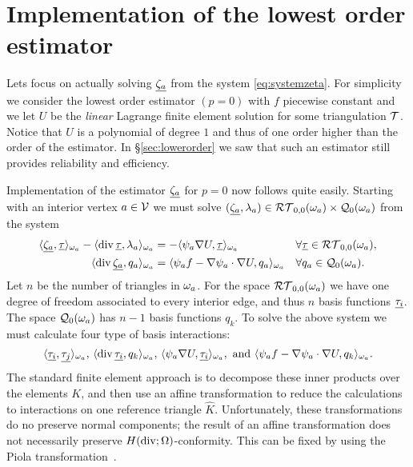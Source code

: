 \documentclass[thesis.tex]{subfiles}
\begin{document}
\section{Implementation of the lowest order estimator}
Lets focus on actually solving $\underline{\zeta_a}$ from the system \eqref{eq:systemzeta}. 
For simplicity we consider the lowest order estimator $(p=0)$ with $f$ piecewise constant and 
we let $U$ be the \emph{linear} Lagrange finite element solution for some triangulation $\mathcal{T}$. 
Notice that $U$ is a polynomial of degree $1$ and thus of one order higher than the order of the estimator.
In \S\ref{sec:lowerorder} we saw that such an estimator still provides reliability and efficiency.


Implementation of the estimator $\underline{\zeta_a}$ for $p=0$ now follows quite easily. 
Starting with an interior vertex $a \in \mathcal{V}$ we must solve $(\underline{\zeta_a}, \lambda_a) \in \mathcal{RT}_{0,0}(\omega_a)\times \mathcal{Q}_0(\omega_a)$ from the system
\begin{equation}
  \label{eq:systemp0}
  \begin{alignedat}{3}
    \langle \underline{\zeta_a}, \underline{\tau} \rangle_{\omega_a} - \langle \operatorname{div} \underline{\tau}, {\lambda_a} \rangle_{\omega_a} &= - \langle \psi_a \nabla U, \underline{\tau} \rangle_{\omega_a} && \quad \forall \underline{\tau} \in \mathcal{RT}_{0,0}(\omega_a),\\
    \langle \operatorname{div} \underline{\zeta_a}, q_a \rangle_{\omega_a} &= \langle \psi_a f - \nabla \psi_a \cdot \nabla U, q_a \rangle_{\omega_a} && \quad \forall q_a \in \mathcal{Q}_0(\omega_a).
  \end{alignedat}
\end{equation}
  Let $n$ be the number of triangles in $\omega_a$.
  For the space $\mathcal{RT}_{0,0}(\omega_a)$ we have one degree of freedom associated to every interior edge, and thus $n$ basis functions $\underline{\tau_i}$. The space $\mathcal{Q}_0(\omega_a)$ has $n-1$ basis functions $q_k$.  To solve the above system we must calculate four type of basis interactions:
  \begin{equation}
    \label{eq:basinact}
    \langle \underline{\tau_i}, \underline{\tau_j} \rangle_{\omega_a}, \, \langle \operatorname{div} \underline{\tau_i}, q_k \rangle_{\omega_a}, \, \langle \psi_a \nabla U, \underline{\tau_i} \rangle_{\omega_a}, \text{ and } \langle \psi_a f - \nabla \psi_a \cdot \nabla U, q_k \rangle_{\omega_a}.
  \end{equation}
  The standard finite element approach is to decompose these inner products over the elements $K$, and then use an affine transformation
  to reduce the calculations to interactions on one reference triangle $\hat K$. Unfortunately, these transformations do no preserve
  normal components; the result of an affine transformation does not necessarily preserve $H(\operatorname{div}; \Omega)$-conformity. This can be fixed 
  by using the Piola transformation~\cite[\S2.1.3]{brezzimixed}. 
  
\end{document}
